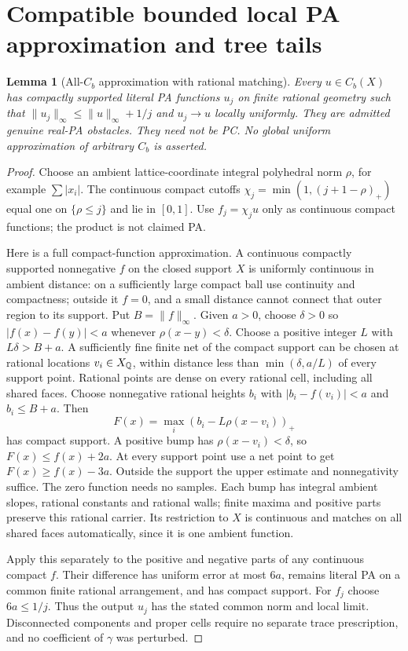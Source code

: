 \documentclass[11pt]{article}
\newtheorem{lemma}[theorem]{Lemma}
\begin{document}
\section{Compatible bounded local PA approximation and tree tails}
\begin{lemma}[All-$C_b$ approximation with rational matching]\label{l:bumps}
Every $u\in C_b(X)$ has compactly supported literal PA functions $u_j$ on finite rational geometry such that $\|u_j\|_\infty\leq\|u\|_\infty+1/j$ and $u_j\to u$ locally uniformly. They are admitted genuine real-PA obstacles. They need not be PC. No global uniform approximation of arbitrary $C_b$ is asserted.
\end{lemma}
\begin{proof}
Choose an ambient lattice-coordinate integral polyhedral norm $\rho$, for example $\sum|x_i|$. The continuous compact cutoffs $\chi_j=\min(1,(j+1-\rho)_+)$ equal one on $\{\rho\leq j\}$ and lie in $[0,1]$. Use $f_j=\chi_j u$ only as continuous compact functions; the product is not claimed PA.

Here is a full compact-function approximation. A continuous compactly supported nonnegative $f$ on the closed support $X$ is uniformly continuous in ambient distance: on a sufficiently large compact ball use continuity and compactness; outside it $f=0$, and a small distance cannot connect that outer region to its support. Put $B=\|f\|_\infty$. Given $a>0$, choose $\delta>0$ so $|f(x)-f(y)|<a$ whenever $\rho(x-y)<\delta$. Choose a positive integer $L$ with $L\delta>B+a$. A sufficiently fine finite net of the compact support can be chosen at rational locations $v_i\in X_\mathbb Q$, within distance less than $\min(\delta,a/L)$ of every support point. Rational points are dense on every rational cell, including all shared faces. Choose nonnegative rational heights $b_i$ with $|b_i-f(v_i)|<a$ and $b_i\leq B+a$. Then
\[
             F(x)=\max_i(b_i-L\rho(x-v_i))_+                         \tag{7.1}
\]
has compact support. A positive bump has $\rho(x-v_i)<\delta$, so $F(x)\leq f(x)+2a$. At every support point use a net point to get $F(x)\geq f(x)-3a$. Outside the support the upper estimate and nonnegativity suffice. The zero function needs no samples. Each bump has integral ambient slopes, rational constants and rational walls; finite maxima and positive parts preserve this rational carrier. Its restriction to $X$ is continuous and matches on all shared faces automatically, since it is one ambient function.

Apply this separately to the positive and negative parts of any continuous compact $f$. Their difference has uniform error at most $6a$, remains literal PA on a common finite rational arrangement, and has compact support. For $f_j$ choose $6a\leq1/j$. Thus the output $u_j$ has the stated common norm and local limit. Disconnected components and proper cells require no separate trace prescription, and no coefficient of $\gamma$ was perturbed.
\end{proof}
\end{document}
